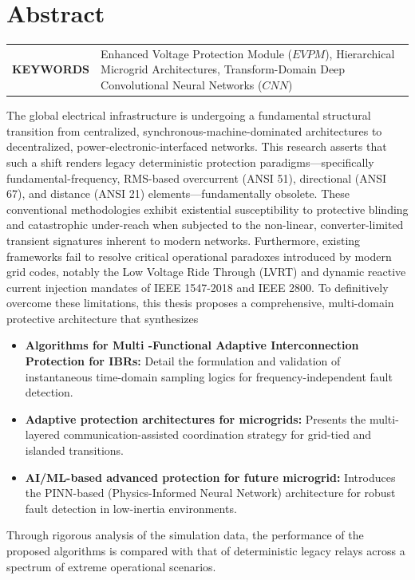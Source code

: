 \chapter{Abstract}
\begin{tabular}{@{} >{\bfseries}p{} p{} @{}}
\MakeUppercase{Keywords} & Enhanced Voltage Protection Module ($EVPM$), Hierarchical Microgrid Architectures, Transform-Domain Deep Convolutional Neural Networks ($CNN$)\\ \end{tabular}
\par










\begin{doublespacing}

The global electrical infrastructure is undergoing a fundamental structural transition from centralized, synchronous-machine-dominated architectures to decentralized, power-electronic-interfaced networks. This research asserts that such a shift renders legacy deterministic protection paradigms—specifically fundamental-frequency, RMS-based overcurrent (ANSI 51), directional (ANSI 67), and distance (ANSI 21) elements—fundamentally obsolete. These conventional methodologies exhibit existential susceptibility to protective blinding and catastrophic under-reach when subjected to the non-linear, converter-limited transient signatures inherent to modern networks. Furthermore, existing frameworks fail to resolve critical operational paradoxes introduced by modern grid codes, notably the Low Voltage Ride Through (LVRT) and dynamic reactive current injection mandates of IEEE 1547-2018 and IEEE 2800. To definitively overcome these limitations, this thesis proposes a comprehensive, multi-domain protective architecture that synthesizes

\begin{itemize}
\item \textbf{ Algorithms for Multi -Functional Adaptive Interconnection Protection for IBRs:} Detail the formulation and validation of instantaneous time-domain sampling logics for frequency-independent fault detection.

\item \textbf{ Adaptive protection architectures for microgrids:} Presents the multi-layered communication-assisted coordination strategy for grid-tied and islanded transitions.

\item \textbf{AI/ML-based advanced protection for future microgrid:} Introduces the PINN-based (Physics-Informed Neural Network) architecture for robust fault detection in low-inertia environments. 

\end{itemize}
Through rigorous analysis of the simulation data, the performance of the proposed algorithms is compared with that of deterministic legacy relays across a spectrum of extreme operational scenarios.


\end{doublespacing}
